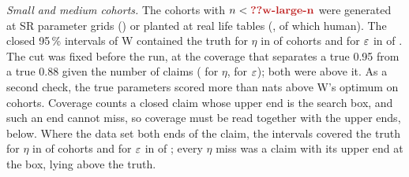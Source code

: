 \emph{Small and medium cohorts.} The  cohorts with $n<\C{w-large-n}$ were generated at SR parameter grids
() or planted at real life tables (, of which  human). The closed 95\,\%
intervals of W contained the truth for $\eta$ in  of  cohorts and for $\varepsilon$ in 
of . The cut was fixed before the run, at the coverage that separates a true 0.95 from a true 0.88 given the
number of claims ( for $\eta$,  for $\varepsilon$); both were above it. As a second check, the true parameters scored
more than  nats above W's optimum on  cohorts. Coverage counts a closed claim whose upper end is
the search box, and such an end cannot miss, so coverage must be read together with the upper ends, below. Where the
data set both ends of the claim, the intervals covered the truth for $\eta$ in  of 
cohorts and for $\varepsilon$ in  of ; every $\eta$ miss was a claim with its upper end at the
box, lying above the truth.

